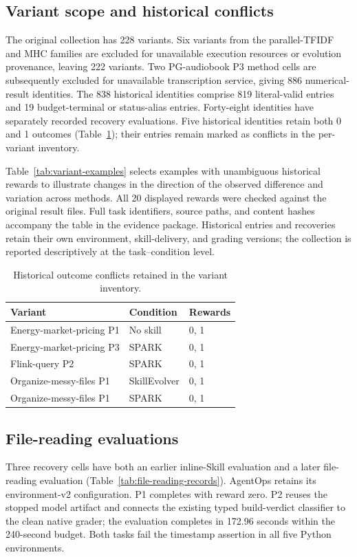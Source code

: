 \subsection{Variant scope and historical conflicts}
The original collection has 228 variants. Six variants from the parallel-TFIDF and MHC families are excluded for unavailable execution resources or evolution provenance, leaving 222 variants. Two PG-audiobook P3 method cells are subsequently excluded for unavailable transcription service, giving 886 numerical-result identities. The 838 historical identities comprise 819 literal-valid entries and 19 budget-terminal or status-alias entries. Forty-eight identities have separately recorded recovery evaluations. Five historical identities retain both 0 and 1 outcomes (Table~\ref{tab:variant-conflicts}); their entries remain marked as conflicts in the per-variant inventory.

Table~\ref{tab:variant-examples} selects examples with unambiguous historical rewards to illustrate changes in the direction of the observed difference and variation across methods. All 20 displayed rewards were checked against the original result files. Full task identifiers, source paths, and content hashes accompany the table in the evidence package. Historical entries and recoveries retain their own environment, skill-delivery, and grading versions; the collection is reported descriptively at the task--condition level.

\begin{table}[ht]
\centering\small
\setlength{\tabcolsep}{3pt}
\begin{tabular}{lll}
\toprule
Variant & Condition & Rewards\\
\midrule
Energy-market-pricing P1 & No skill & 0, 1\\
Energy-market-pricing P3 & SPARK & 0, 1\\
Flink-query P2 & SPARK & 0, 1\\
Organize-messy-files P1 & SkillEvolver & 0, 1\\
Organize-messy-files P1 & SPARK & 0, 1\\
\bottomrule
\end{tabular}
\caption{Historical outcome conflicts retained in the variant inventory.}
\label{tab:variant-conflicts}
\end{table}

\subsection{File-reading evaluations}
Three recovery cells have both an earlier inline-Skill evaluation and a later file-reading evaluation (Table~\ref{tab:file-reading-records}). AgentOps retains its environment-v2 configuration. P1 completes with reward zero. P2 reuses the stopped model artifact and connects the existing typed build-verdict classifier to the clean native grader; the evaluation completes in 172.96 seconds within the 240-second budget. Both tasks fail the timestamp assertion in all five Python environments.

